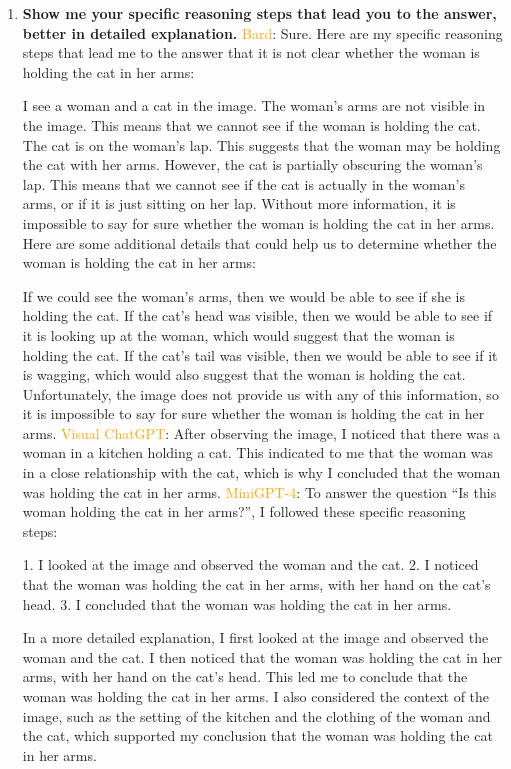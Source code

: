\begin{enumerate}
    Without more information, it is impossible to say for sure whether the woman is holding the cat in her arms.
    \subitem \textcolor{orange}{Visual ChatGPT}: Yes, the woman is holding the cat in her arms.
    \subitem \textcolor{orange}{MiniGPT-4}: Yes, the woman is holding the cat in her arms.
    \item \textbf{Show me your specific reasoning steps that lead you to the answer, better in detailed explanation.}
    \subitem \textcolor{orange}{Bard}: Sure. Here are my specific reasoning steps that lead me to the answer that it is not clear whether the woman is holding the cat in her arms:

    I see a woman and a cat in the image.
    The woman's arms are not visible in the image. This means that we cannot see if the woman is holding the cat.
    The cat is on the woman's lap. This suggests that the woman may be holding the cat with her arms.
    However, the cat is partially obscuring the woman's lap. This means that we cannot see if the cat is actually in the woman's arms, or if it is just sitting on her lap.
    Without more information, it is impossible to say for sure whether the woman is holding the cat in her arms.
    Here are some additional details that could help us to determine whether the woman is holding the cat in her arms:
    
    If we could see the woman's arms, then we would be able to see if she is holding the cat.
    If the cat's head was visible, then we would be able to see if it is looking up at the woman, which would suggest that the woman is holding the cat.
    If the cat's tail was visible, then we would be able to see if it is wagging, which would also suggest that the woman is holding the cat.
    Unfortunately, the image does not provide us with any of this information, so it is impossible to say for sure whether the woman is holding the cat in her arms.
    \subitem \textcolor{orange}{Visual ChatGPT}: After observing the image, I noticed that there was a woman in a kitchen holding a cat. This indicated to me that the woman was in a close relationship with the cat, which is why I concluded that the woman was holding the cat in her arms.
    \subitem \textcolor{orange}{MiniGPT-4}: To answer the question “Is this woman holding the cat in her arms?”, I followed these specific reasoning steps:

    1. I looked at the image and observed the woman and the cat.
    2. I noticed that the woman was holding the cat in her arms, with her hand on the cat’s head.
    3. I concluded that the woman was holding the cat in her arms.
    
    In a more detailed explanation, I first looked at the image and observed the woman and the cat. I then noticed that the woman was holding the cat in her arms, with her hand on the cat’s head. This led me to conclude that the woman was holding the cat in her arms. I also considered the context of the image, such as the setting of the kitchen and the clothing of the woman and the cat, which supported my conclusion that the woman was holding the cat in her arms.
\end{enumerate}